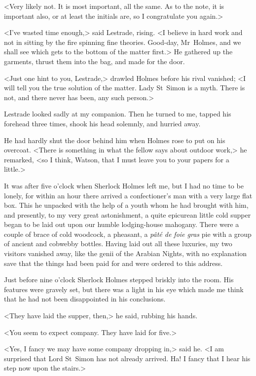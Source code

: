 <Very likely not. It is most important, all the same. As to the note, it is important also, or at least the initials are, so I congratulate you again.>

<I've wasted time enough,> said Lestrade, rising. <I believe in hard work and not in sitting by the fire spinning fine theories. Good-day, Mr~Holmes, and we shall see which gets to the bottom of the matter first.> He gathered up the garments, thrust them into the bag, and made for the door.

<Just one hint to you, Lestrade,> drawled Holmes before his rival vanished; <I will tell you the true solution of the matter. Lady St~Simon is a myth. There is not, and there never has been, any such person.>

Lestrade looked sadly at my companion. Then he turned to me, tapped his forehead three times, shook his head solemnly, and hurried away.

He had hardly shut the door behind him when Holmes rose to put on his overcoat. <There is something in what the fellow says about outdoor work,> he remarked, <so I think, Watson, that I must leave you to your papers for a little.>

It was after five o'clock when Sherlock Holmes left me, but I had no time to be lonely, for within an hour there arrived a confectioner's man with a very large flat box. This he unpacked with the help of a youth whom he had brought with him, and presently, to my very great astonishment, a quite epicurean little cold supper began to be laid out upon our humble lodging-house mahogany. There were a couple of brace of cold woodcock, a pheasant, a \textit{pâté de foie gras} pie with a group of ancient and cobwebby bottles. Having laid out all these luxuries, my two visitors vanished away, like the genii of the Arabian Nights, with no explanation save that the things had been paid for and were ordered to this address.

Just before nine o'clock Sherlock Holmes stepped briskly into the room. His features were gravely set, but there was a light in his eye which made me think that he had not been disappointed in his conclusions.

<They have laid the supper, then,> he said, rubbing his hands.

<You seem to expect company. They have laid for five.>

<Yes, I fancy we may have some company dropping in,> said he. <I am surprised that Lord St~Simon has not already arrived. Ha! I fancy that I hear his step now upon the stairs.>

